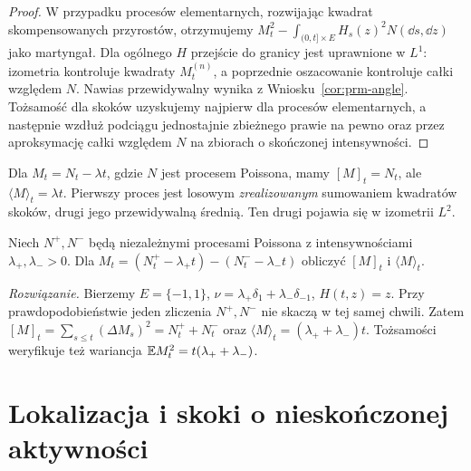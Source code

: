 \begin{proof}
W przypadku procesów elementarnych, rozwijając kwadrat
skompensowanych przyrostów, otrzymujemy
$M_t^2-\int_{(0,t]\times E}H_s(z)^2N(\dd s,\dd z)$
jako martyngał. Dla ogólnego $H$ przejście do granicy jest
uprawnione w $L^1$: izometria kontroluje kwadraty $M_t^{(n)}$,
a poprzednie oszacowanie kontroluje całki względem $N$.
Nawias przewidywalny wynika z Wniosku~\ref{cor:prm-angle}.
Tożsamość dla skoków uzyskujemy najpierw dla procesów
elementarnych, a następnie wzdłuż podciągu jednostajnie
zbieżnego prawie na pewno oraz przez aproksymację całki
względem $N$ na zbiorach o skończonej intensywności.
\end{proof}

\begin{uwaga}
Dla $M_t=N_t-\lambda t$, gdzie $N$ jest procesem
Poissona, mamy $[M]_t=N_t$, ale
$\langle M\rangle_t=\lambda t$. Pierwszy proces
jest losowym \emph{zrealizowanym} sumowaniem kwadratów
skoków, drugi jego przewidywalną średnią.
Ten drugi pojawia się w izometrii $L^2$.
\end{uwaga}

\begin{zadanie}
Niech $N^+,N^-$ będą niezależnymi procesami Poissona z
intensywnościami $\lambda_+,\lambda_->0$. Dla
$M_t=(N_t^+-\lambda_+t)-(N_t^--\lambda_-t)$ obliczyć
$[M]_t$ i $\langle M\rangle_t$.

\emph{Rozwiązanie.} Bierzemy $E=\{-1,1\}$,
$\nu=\lambda_+\delta_1+\lambda_-\delta_{-1}$,
$H(t,z)=z$. Przy prawdopodobieństwie jeden zliczenia
$N^+,N^-$ nie skaczą w tej samej chwili. Zatem
$[M]_t=\sum_{s\le t}(\Delta M_s)^2=N_t^++N_t^-$ oraz
$\langle M\rangle_t=(\lambda_++\lambda_-)t$.
Tożsamości weryfikuje też wariancja
$\mathbb{E} M_t^2=t(\lambda_++\lambda_-)$.
\end{zadanie}

\section{Lokalizacja i skoki o nieskończonej aktywności}

